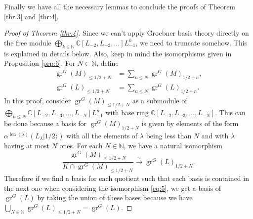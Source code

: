 \documentclass[12pt,a4paper]{article}
\DeclareMathOperator{\gr}{gr}
\DeclareMathOperator{\len}{len}
\newcommand{\vachalf}{|1/2\rangle}
\begin{document}
Finally we have all the necessary lemmas to conclude the proofs of Theorem \ref{thr:3} and \ref{thr:4}.
\begin{proof}[Proof of Theorem \ref{thr:4}]
  Since we can't apply Groebner basis theory directly on the free module $\bigoplus_{k\in \mathbb{N}}\mathbb{C}[L_{-2},L_{-3},\dots]L_{-1}^k$, we need to truncate somehow.
  This is explained in details below.
  Also, keep in mind the isomorphisms given in Proposition \ref{prp:6}.
  For $N\in \mathbb{N}$, define
  \begin{align*}
    \gr^G(M)_{\le 1/2+N}&=\sum_{n\le N}\gr^G(M)_{1/2+n},\\
    \gr^G(L)_{\le 1/2+N}&=\sum_{n\le N}\gr^G(L)_{1/2+n}.
  \end{align*}
  In this proof, consider $\gr^G(M)_{\le 1/2+N}$ as a submodule of $\bigoplus_{n\le N}\mathbb{C}[L_{-2},L_{-3},\dots, L_{-N}]L_{-1}^n$ with base ring $\mathbb{C}[L_{-2},L_{-3},\dots, L_{-N}]$.
  This can be done because a basis for $\gr^G(M)_{1/2+N}$ is given by elements of the form $\alpha^{\len(\lambda)}(L_\lambda\vachalf)$ with all the elements of $\lambda$ being less than $N$ and with $\lambda$ having at most $N$ ones.
  For each $N\in \mathbb{N}$, we have a natural isomorphism
  \begin{equation}
    \label{eq:5}
    \frac{\gr^G(M)_{\le 1/2+N}}{K\cap \gr^G(M)_{\le 1/2+N}}\xrightarrow{\sim} \gr^G(L)_{1/2+N}.
  \end{equation}
  Therefore if we find a basis for each quotient such that each basis is contained in the next one when considering the isomorphism \eqref{eq:5}, we get a basis of $\gr^G(L)$ by taking the union of these bases because we have $\bigcup_{N\in \mathbb{N}}\gr^G(L)_{\le 1/2+N}=\gr^G(L)$.
  

\end{proof}
\end{document}
